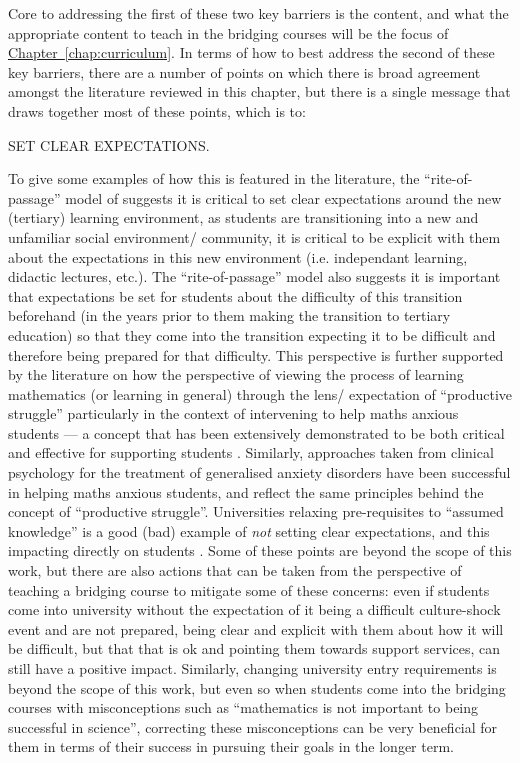 \documentclass[twoside,12pt,a4paper]{report}
\newcommand{\refchap}[1]{\hyperref[chap:#1]{Chapter~\ref{chap:#1}}}
\begin{document}
Core to addressing the first of these two key barriers is the content, and what the appropriate content to teach in the bridging courses will be the focus of \refchap{curriculum}. In terms of how to best address the second of these key barriers, there are a number of points on which there is broad agreement amongst the literature reviewed in this chapter, but there is a single message that draws together most of these points, which is to:
\begin{center}
	{\large SET CLEAR EXPECTATIONS.}
\end{center}
To give some examples of how this is featured in the literature, the ``rite-of-passage'' model of  suggests it is critical to set clear expectations around the new (tertiary) learning environment, as students are transitioning into a new and unfamiliar social environment/ community, it is critical to be explicit with them about the expectations in this new environment (i.e. independant learning, didactic lectures, etc.). The ``rite-of-passage'' model also suggests it is important that expectations be set for students about the difficulty of this transition beforehand (in the years prior to them making the transition to tertiary education) so that they come into the transition expecting it to be difficult and therefore being prepared for that difficulty. This perspective is further supported by the literature on how the perspective of viewing the process of learning mathematics (or learning in general) through the lens/  expectation of ``productive struggle'' particularly in the context of intervening to help maths anxious students --- a concept that has been extensively demonstrated to be both critical and effective for supporting students \cite{Wang2015, Lin-Siegler2016, Hiebert2007, Carlson1999}.  Similarly, approaches taken from clinical psychology for the treatment of generalised anxiety disorders have been successful in helping maths anxious students, and reflect the same principles behind the concept of ``productive struggle''. Universities relaxing pre-requisites to ``assumed knowledge'' is a good (bad) example of \emph{not} setting clear expectations, and this impacting directly on students \cite{Gordon2015}. Some of these points are beyond the scope of this work, but there are also actions that can be taken from the perspective of teaching a bridging course to mitigate some of these concerns: even if students come into university without the expectation of it being a difficult culture-shock event and are not prepared, being clear and explicit with them about how it will be difficult, but that that is ok and pointing them towards support services, can still have a positive impact. Similarly, changing university entry requirements is beyond the scope of this work, but even so when students come into the bridging courses with misconceptions such as ``mathematics is not important to being successful in science'', correcting these misconceptions can be very beneficial for them in terms of their success in pursuing their goals in the longer term.
\end{document}
